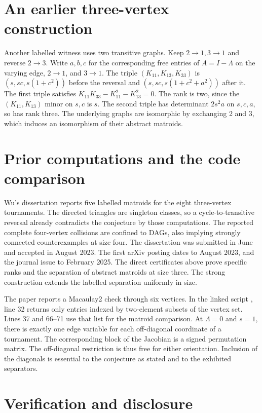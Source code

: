 \documentclass[11pt,a4paper]{amsart}
\begin{document}
\section{An earlier three-vertex construction}

Another labelled witness uses two transitive graphs. Keep
\(2\to1,3\to1\) and reverse \(2\to3\). Write
\(a,b,c\) for the corresponding free entries of \(A=I-\Lambda\)
on the varying edge, \(2\to1\), and \(3\to1\).
The triple \((K_{11},K_{13},K_{33})\) is
\((s,sc,s(1+c^2))\) before the reversal and
\((s,sc,s(1+c^2+a^2))\) after it.
The first triple satisfies
\(K_{11}K_{33}-K_{11}^2-K_{13}^2=0\).
The rank is two, since the \((K_{11},K_{13})\) minor on \(s,c\) is \(s\).
The second triple has determinant \(2s^2a\) on \(s,c,a\), so has
rank three. The underlying graphs are isomorphic by exchanging
2 and 3, which induces an isomorphism of their abstract matroids.

\section{Prior computations and the code comparison}

Wu's dissertation \cite[\S5.4.1, p.~63]{wu} reports five labelled
matroids for the eight three-vertex tournaments. The directed triangles
are singleton classes, so a cycle-to-transitive reversal already
contradicts the conjecture by those computations. The reported complete
four-vertex collisions are confined to DAGs, also implying strongly
connected counterexamples at size four. The dissertation was submitted in June and accepted in August 2023.
The first arXiv posting dates to August 2023, and the journal issue to
February 2025.
The direct certificates above prove specific ranks and the separation
of abstract matroids at size three. The strong construction extends
the labelled separation uniformly in size.

The paper reports a Macaulay2 check through six vertices. In the
linked script \cite{code}, line 32 returns only entries indexed by
two-element subsets of the vertex set. Lines 37 and 66--71 use
that list for the matroid comparison. At \(\Lambda=0\) and \(s=1\),
there is exactly one edge variable for each off-diagonal coordinate
of a tournament. The corresponding block of the Jacobian is a
signed permutation matrix. The off-diagonal restriction is thus
free for either orientation. Inclusion of the diagonals is essential
to the conjecture as stated and to the exhibited separators.

\section{Verification and disclosure}
\end{document}
